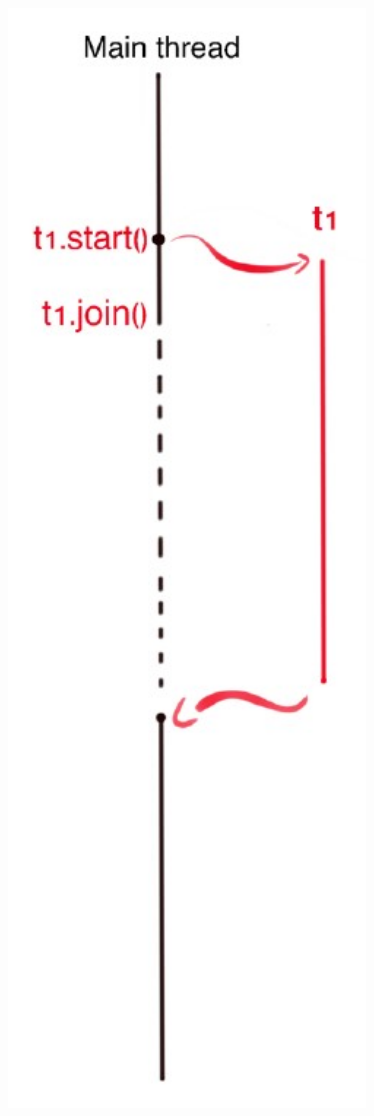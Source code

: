 \begin{center}
    \includegraphics[width=0.75\textwidth]{img/sincronizzazione_join1.jpg}
\end{center}

